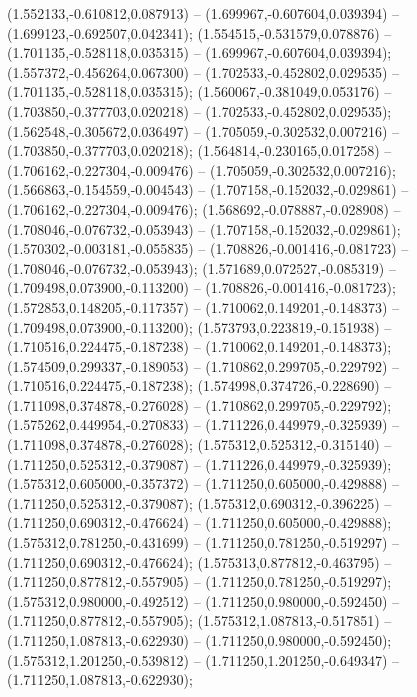  (1.552133,-0.610812,0.087913) -- (1.699967,-0.607604,0.039394) -- (1.699123,-0.692507,0.042341);
 (1.554515,-0.531579,0.078876) -- (1.701135,-0.528118,0.035315) -- (1.699967,-0.607604,0.039394);
 (1.557372,-0.456264,0.067300) -- (1.702533,-0.452802,0.029535) -- (1.701135,-0.528118,0.035315);
 (1.560067,-0.381049,0.053176) -- (1.703850,-0.377703,0.020218) -- (1.702533,-0.452802,0.029535);
 (1.562548,-0.305672,0.036497) -- (1.705059,-0.302532,0.007216) -- (1.703850,-0.377703,0.020218);
 (1.564814,-0.230165,0.017258) -- (1.706162,-0.227304,-0.009476) -- (1.705059,-0.302532,0.007216);
 (1.566863,-0.154559,-0.004543) -- (1.707158,-0.152032,-0.029861) -- (1.706162,-0.227304,-0.009476);
 (1.568692,-0.078887,-0.028908) -- (1.708046,-0.076732,-0.053943) -- (1.707158,-0.152032,-0.029861);
 (1.570302,-0.003181,-0.055835) -- (1.708826,-0.001416,-0.081723) -- (1.708046,-0.076732,-0.053943);
 (1.571689,0.072527,-0.085319) -- (1.709498,0.073900,-0.113200) -- (1.708826,-0.001416,-0.081723);
 (1.572853,0.148205,-0.117357) -- (1.710062,0.149201,-0.148373) -- (1.709498,0.073900,-0.113200);
 (1.573793,0.223819,-0.151938) -- (1.710516,0.224475,-0.187238) -- (1.710062,0.149201,-0.148373);
 (1.574509,0.299337,-0.189053) -- (1.710862,0.299705,-0.229792) -- (1.710516,0.224475,-0.187238);
 (1.574998,0.374726,-0.228690) -- (1.711098,0.374878,-0.276028) -- (1.710862,0.299705,-0.229792);
 (1.575262,0.449954,-0.270833) -- (1.711226,0.449979,-0.325939) -- (1.711098,0.374878,-0.276028);
 (1.575312,0.525312,-0.315140) -- (1.711250,0.525312,-0.379087) -- (1.711226,0.449979,-0.325939);
 (1.575312,0.605000,-0.357372) -- (1.711250,0.605000,-0.429888) -- (1.711250,0.525312,-0.379087);
 (1.575312,0.690312,-0.396225) -- (1.711250,0.690312,-0.476624) -- (1.711250,0.605000,-0.429888);
 (1.575312,0.781250,-0.431699) -- (1.711250,0.781250,-0.519297) -- (1.711250,0.690312,-0.476624);
 (1.575313,0.877812,-0.463795) -- (1.711250,0.877812,-0.557905) -- (1.711250,0.781250,-0.519297);
 (1.575312,0.980000,-0.492512) -- (1.711250,0.980000,-0.592450) -- (1.711250,0.877812,-0.557905);
 (1.575312,1.087813,-0.517851) -- (1.711250,1.087813,-0.622930) -- (1.711250,0.980000,-0.592450);
 (1.575312,1.201250,-0.539812) -- (1.711250,1.201250,-0.649347) -- (1.711250,1.087813,-0.622930);
